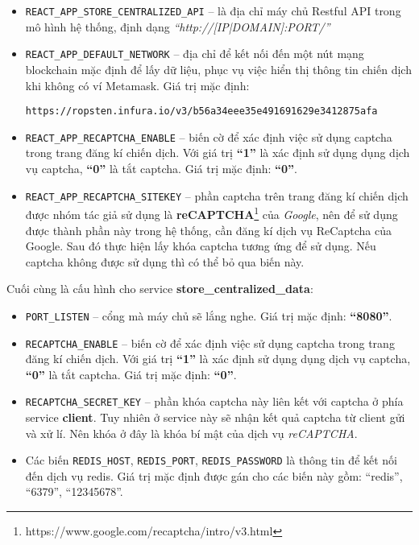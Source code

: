 \documentclass[../main-report.tex]{subfiles}
\begin{document}
\begin{itemize}
\item \texttt{REACT\_APP\_STORE\_CENTRALIZED\_API}  -- là địa chỉ máy chủ Restful API trong mô hình hệ thống, định dạng \textit{``http://[IP|DOMAIN]:PORT/''}
\item \texttt{REACT\_APP\_DEFAULT\_NETWORK} -- địa chỉ để kết nối đến một nút mạng blockchain mặc định để lấy dữ liệu, phục vụ việc hiển thị thông tin chiến dịch khi không có ví Metamask. Giá trị mặc định:

\begin{lstlisting}
https://ropsten.infura.io/v3/b56a34eee35e491691629e3412875afa
\end{lstlisting}

\item \texttt{REACT\_APP\_RECAPTCHA\_ENABLE} -- biến cờ để xác định việc sử dụng captcha trong trang đăng kí chiến dịch. Với giá trị \textbf{``1''} là xác định sử dụng dụng dịch vụ captcha, \textbf{``0''} là tắt captcha. Giá trị mặc định: \textbf{``0''}.
\item \texttt{REACT\_APP\_RECAPTCHA\_SITEKEY} -- phần captcha trên trang đăng kí chiến dịch được nhóm tác giả sử dụng là \textbf{reCAPTCHA}\footnote{https://www.google.com/recaptcha/intro/v3.html} của \textit{Google}, nên để sử dụng được thành phần này trong hệ thống, cần đăng kí dịch vụ ReCaptcha của Google. Sau đó thực hiện lấy khóa captcha tương ứng để sử dụng. Nếu captcha không được sử dụng thì có thể bỏ qua biến này.
\end{itemize}

Cuối cùng là cấu hình cho service \textbf{store\_centralized\_data}:

\begin{itemize}
\item \texttt{PORT\_LISTEN} -- cổng mà máy chủ sẽ lắng nghe. Giá trị mặc định: \textbf{``8080''}.
\item \texttt{RECAPTCHA\_ENABLE} -- biến cờ để xác định việc sử dụng captcha trong trang đăng kí chiến dịch. Với giá trị \textbf{``1''} là xác định sử dụng dụng dịch vụ captcha, \textbf{``0''} là tắt captcha. Giá trị mặc định: \textbf{``0''}.
\item \texttt{RECAPTCHA\_SECRET\_KEY} -- phần khóa captcha này liên kết với captcha ở phía service \textbf{client}. Tuy nhiên ở service này sẽ nhận kết quả captcha từ client gửi và xử lí. Nên khóa ở đây là khóa bí mật của dịch vụ \textit{reCAPTCHA}.
\item Các biến \texttt{REDIS\_HOST}, \texttt{REDIS\_PORT}, \texttt{REDIS\_PASSWORD} là thông tin để kết nối đến dịch vụ redis. Giá trị mặc định được gán cho các biến này gồm: ``redis'', ``6379'', ``12345678''.
\end{itemize}
\end{document}
